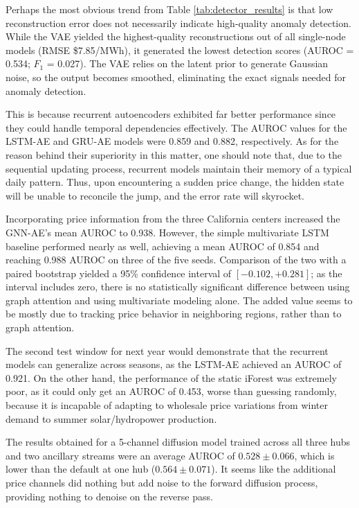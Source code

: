 \documentclass[journal]{IEEEtran}
\begin{document}
Perhaps the most obvious trend from Table \ref{tab:detector_results} is that low reconstruction error does not necessarily indicate high-quality anomaly detection. While the VAE yielded the highest-quality reconstructions out of all single-node models (RMSE \$7.85/MWh), it generated the lowest detection scores (AUROC = 0.534; $F_1$ = 0.027). The VAE relies on the latent prior to generate Gaussian noise, so the output becomes smoothed, eliminating the exact signals needed for anomaly detection.

This is because recurrent autoencoders exhibited far better performance since they could handle temporal dependencies effectively. The AUROC values for the LSTM-AE and GRU-AE models were 0.859 and 0.882, respectively. As for the reason behind their superiority in this matter, one should note that, due to the sequential updating process, recurrent models maintain their memory of a typical daily pattern. Thus, upon encountering a sudden price change, the hidden state will be unable to reconcile the jump, and the error rate will skyrocket.

Incorporating price information from the three California centers increased the GNN-AE's mean AUROC to 0.938. However, the simple multivariate LSTM baseline performed nearly as well, achieving a mean AUROC of 0.854 and reaching 0.988 AUROC on three of the five seeds. Comparison of the two with a paired bootstrap yielded a 95\% confidence interval of $[-0.102, +0.281]$; as the interval includes zero, there is no statistically significant difference between using graph attention and using multivariate modeling alone. The added value seems to be mostly due to tracking price behavior in neighboring regions, rather than to graph attention.

The second test window for next year would demonstrate that the recurrent models can generalize across seasons, as the LSTM-AE achieved an AUROC of 0.921. On the other hand, the performance of the static iForest was extremely poor, as it could only get an AUROC of 0.453, worse than guessing randomly, because it is incapable of adapting to wholesale price variations from winter demand to summer solar/hydropower production.

The results obtained for a 5-channel diffusion model trained across all three hubs and two ancillary streams were an average AUROC of $0.528\pm0.066$, which is lower than the default at one hub ($0.564\pm0.071$). It seems like the additional price channels did nothing but add noise to the forward diffusion process, providing nothing to denoise on the reverse pass.
\end{document}
